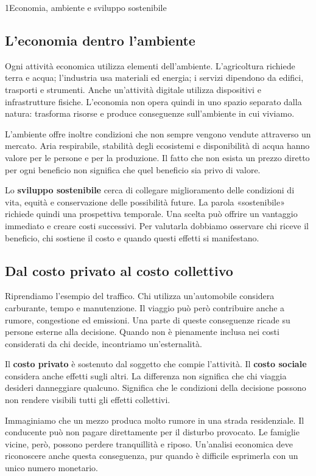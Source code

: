 \begin{lettura}{1}{Economia, ambiente e sviluppo sostenibile}


\subsection*{L'economia dentro l'ambiente}
Ogni attività economica utilizza elementi dell'ambiente. L'agricoltura richiede terra e acqua; l'industria usa materiali ed energia; i servizi dipendono da edifici, trasporti e strumenti. Anche un'attività digitale utilizza dispositivi e infrastrutture fisiche. L'economia non opera quindi in uno spazio separato dalla natura: trasforma risorse e produce conseguenze sull'ambiente in cui viviamo.

L'ambiente offre inoltre condizioni che non sempre vengono vendute attraverso un mercato. Aria respirabile, stabilità degli ecosistemi e disponibilità di acqua hanno valore per le persone e per la produzione. Il fatto che non esista un prezzo diretto per ogni beneficio non significa che quel beneficio sia privo di valore.

Lo \textbf{sviluppo sostenibile} cerca di collegare miglioramento delle condizioni di vita, equità e conservazione delle possibilità future. La parola «sostenibile» richiede quindi una prospettiva temporale. Una scelta può offrire un vantaggio immediato e creare costi successivi. Per valutarla dobbiamo osservare chi riceve il beneficio, chi sostiene il costo e quando questi effetti si manifestano.

\subsection*{Dal costo privato al costo collettivo}
Riprendiamo l'esempio del traffico. Chi utilizza un'automobile considera carburante, tempo e manutenzione. Il viaggio può però contribuire anche a rumore, congestione ed emissioni. Una parte di queste conseguenze ricade su persone esterne alla decisione. Quando non è pienamente inclusa nei costi considerati da chi decide, incontriamo un'esternalità.

Il \textbf{costo privato} è sostenuto dal soggetto che compie l'attività. Il \textbf{costo sociale} considera anche effetti sugli altri. La differenza non significa che chi viaggia desideri danneggiare qualcuno. Significa che le condizioni della decisione possono non rendere visibili tutti gli effetti collettivi.

Immaginiamo che un mezzo produca molto rumore in una strada residenziale. Il conducente può non pagare direttamente per il disturbo provocato. Le famiglie vicine, però, possono perdere tranquillità e riposo. Un'analisi economica deve riconoscere anche questa conseguenza, pur quando è difficile esprimerla con un unico numero monetario.


\end{lettura}
